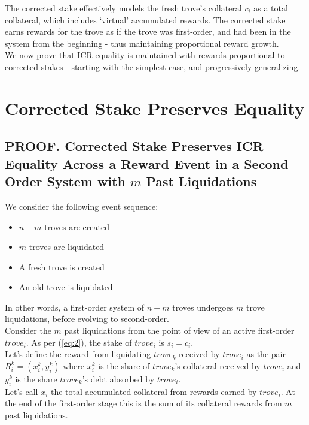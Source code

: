 \documentclass[reqno]{article}
\begin{document}
The corrected stake effectively models the fresh trove’s collateral $c_i$ as a total collateral, which includes ‘virtual’ accumulated rewards. The corrected stake earns rewards for the trove as if the trove was first-order, and had been in the system from the beginning - thus maintaining proportional reward growth.\\

We now prove that ICR equality is maintained with rewards proportional to corrected stakes - starting with the simplest case, and progressively generalizing.

\section{Corrected Stake Preserves Equality}

\subsection{PROOF. Corrected Stake Preserves ICR Equality Across a Reward Event in a Second Order System with $m$ Past Liquidations}

We consider the following event sequence:

\begin{itemize}
  \item $n+m$ troves are created
  \item $m$ troves are liquidated
  \item A fresh trove is created
  \item An old trove is liquidated
\end{itemize}

\bigskip
In other words, a first-order system of $n+m$ troves undergoes $m$ trove liquidations, before evolving to second-order.\\

Consider the $m$ past liquidations from the point of view of an active first-order $trove_i$. As per (\ref{eq:2}), the stake of $trove_i$ is $s_i = c_i$.\\

Let’s define the reward from liquidating $trove_k$ received by $trove_i$ as the pair $R_i^k = (x_i^k, y_i^k)$ where $x_i^k$ is the share of $trove_k$’s collateral received by $trove_i$ and $y_i^k$ is the share $trove_k$’s debt absorbed by $trove_i$.\\

Let’s call $x_i$ the total accumulated collateral from rewards earned by $trove_i$. At the end of the first-order stage this is the sum of its collateral rewards from $m$ past liquidations.\\
\end{document}
